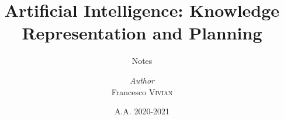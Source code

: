 \documentclass[a4paper, 12pt]{report}
\institute{Ca' Foscari University}
\title{Artificial Intelligence: Knowledge Representation and Planning}
\subtitle{Notes}
\author{\textit{Author}\\Francesco \textsc{Vivian}}
\date{A.A. 2020-2021}
\begin{document}
    \maketitle
    \romantableofcontents
\end{document}
